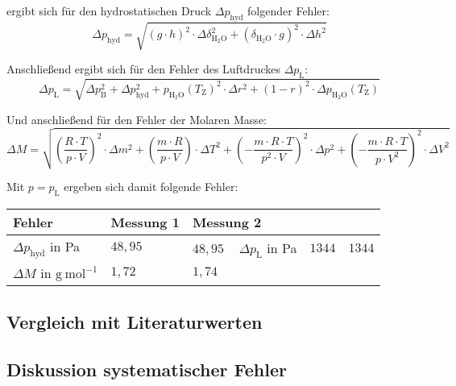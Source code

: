 \documentclass[12pt,a4paper,titlepage,headinclude,bibtotoc]{scrartcl}
\begin{document}
ergibt sich für den hydrostatischen Druck $\Delta p_\mathrm{hyd}$ folgender Fehler:\\

\begin{equation}
\Delta p_\mathrm{hyd} =  \sqrt{(g \cdot h)^2 \cdot \Delta \delta_\mathrm{H_2O}^2 + (\delta_\mathrm{H_2O} \cdot g)^2 \cdot \Delta h^2}
\end{equation}


Anschließend ergibt sich für den Fehler des Luftdruckes $\Delta p_\mathrm{L}$:\\


\begin{equation}
\Delta p_\mathrm{L} = \sqrt{\Delta p_\mathrm{B}^2 + \Delta p_\mathrm{hyd}^2 + p_\mathrm{H_2O}(T_\mathrm{Z})^2 \cdot \Delta r^2 + (1-r)^2 \cdot \Delta p_\mathrm{H_2O}(T_\mathrm{Z})}
\end{equation}

Und anschließend für den Fehler der Molaren Masse:\\

\begin{equation}
\Delta M = \sqrt{\left(\frac{R\cdot T}{p\cdot V}\right)^2 \cdot \Delta m^2 + \left(\frac{m\cdot R}{p\cdot V} \right) \cdot \Delta T^2 + \left(-\frac{m\cdot R\cdot T}{p^2 \cdot V}\right)^2 \cdot \Delta p^2 + \left(-\frac{m \cdot R \cdot T}{p \cdot V^2} \right)^2 \cdot \Delta V^2}
\end{equation}

Mit $p = p_\mathrm{L}$ ergeben sich damit folgende Fehler:\\

\begin{table} [h]
\centering
\begin{tabular}{|p{4 cm}||p{4 cm}|p{4 cm}|}
        \hline
		Fehler & Messung 1 & Messung 2\\
         \hline 
        $\Delta p_\mathrm{hyd}$ in Pa & $48,95$  & $48,95$ \
        \hline
        $\Delta p_\mathrm{L}   $ in Pa & $1344$  & $1344$ \\
        \hline
        $\Delta M $ in $\mathrm{g{~}mol^{-1}}$ & $1,72$ & $1,74$ \\
        \hline     
\end{tabular}
\end{table}

\subsection{Vergleich mit Literaturwerten}

\subsection{Diskussion systematischer Fehler}
\end{document}
